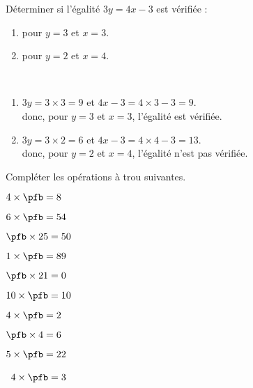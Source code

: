 \begin{colonne*exercice}
\bigskip


\begin{exercice} %
   Déterminer si l'égalité $3y =4x-3$ est vérifiée :
   \begin{enumerate}
      \item pour $y =3$ et $x =3$.
      \item pour $y =2$ et $x =4$.
   \end{enumerate}
\end{exercice}

\begin{corrige}
   \ \\ [-5mm]
   \begin{enumerate}
      \item $3y =3\times3 =9$ et $4x-3 =4\times3-3 =9$. \\
      donc, pour $y =3$ et $x =3$, {\blue l'égalité est vérifiée}.
      \item $3y =3\times2 =6$ et $4x-3 =4\times4-3 =13$. \\
      donc, pour $y =2$ et $x =4$, {\blue l'égalité n'est pas vérifiée}.
   \end{enumerate}
\end{corrige}

\bigskip



\bigskip

\begin{exercice} %
   Compléter les opérations à trou suivantes. \smallskip
   \begin{colenumerate}{2}
      \item $4\times\pfb =8$ \hfill \smallskip
      \item $6\times\pfb =54$ \hfill \smallskip
      \item $\pfb\times25 =50$ \hfill \smallskip
      \item $1\times\pfb =89$ \hfill \smallskip
      \item $\pfb\times21=0$ \hfill \smallskip
      \item $10\times\pfb =10$ \hfill
      \item $4\times\pfb =2$ \hfill
      \item $\pfb\times4 =6$ \hfill
      \item $5\times\pfb =22$ \hfill
      \item \, $4\times\pfb =3$ \hfill
   \end{colenumerate}
\end{exercice}


\end{colonne*exercice}
